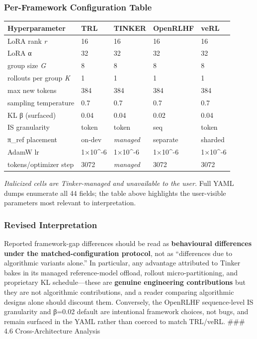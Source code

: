 \documentclass[
  american,
  11pt,
  a4paper,
  oneside]{report}
\newcounter{none} %
\begin{document}
\subsubsection{Per-Framework Configuration
Table}\label{per-framework-configuration-table}

{\def\LTcaptype{none} %
\begin{longtable}[]{@{}lllll@{}}
\toprule\noalign{}
Hyperparameter & TRL & TINKER & OpenRLHF & veRL \\
\midrule\noalign{}
\endhead
\bottomrule\noalign{}
\endlastfoot
LoRA rank \emph{r} & 16 & 16 & 16 & 16 \\
LoRA α & 32 & 32 & 32 & 32 \\
group size \emph{G} & 8 & 8 & 8 & 8 \\
rollouts per group \emph{K} & 1 & 1 & 1 & 1 \\
max new tokens & 384 & 384 & 384 & 384 \\
sampling temperature & 0.7 & 0.7 & 0.7 & 0.7 \\
KL β (surfaced) & 0.04 & 0.04 & 0.02 & 0.04 \\
IS granularity & token & token & seq & token \\
π\_ref placement & on-dev & \emph{managed} & separate & sharded \\
AdamW lr & 1×10\^{}-6 & 1×10\^{}-6 & 1×10\^{}-6 & 1×10\^{}-6 \\
tokens/optimizer step & 3072 & \emph{managed} & 3072 & 3072 \\
\end{longtable}
}

\emph{Italicized cells are Tinker-managed and unavailable to the user.}
Full YAML dumps enumerate all 44 fields; the table above highlights the
user-visible parameters most relevant to interpretation.

\subsubsection{Revised Interpretation}\label{revised-interpretation}

Reported framework-gap differences should be read as \textbf{behavioural
differences under the matched-configuration protocol}, not as
``differences due to algorithmic variants alone.'' In particular, any
advantage attributed to Tinker bakes in its managed reference-model
offload, rollout micro-partitioning, and proprietary KL schedule---these
are \textbf{genuine engineering contributions} but they are not
algorithmic contributions, and a reader comparing algorithmic designs
alone should discount them. Conversely, the OpenRLHF sequence-level IS
granularity and β=0.02 default are intentional framework choices, not
bugs, and remain surfaced in the YAML rather than coerced to match
TRL/veRL. \#\#\# 4.6 Cross-Architecture Analysis
\end{document}
